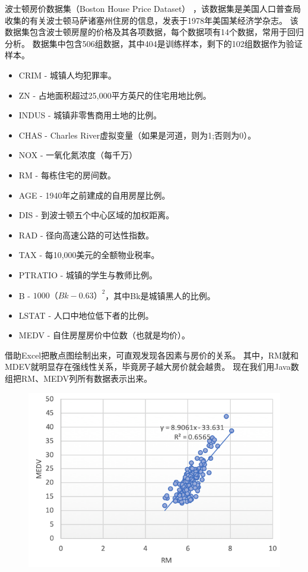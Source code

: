 \begin{example}
	波士顿房价数据集（Boston House Price Dataset）
	，该数据集是美国人口普查局收集的有关波士顿马萨诸塞州住房的信息，发表于1978年美国某经济学杂志。
	该数据集包含波士顿房屋的价格及其各项数据，每个数据项有14个数据，常用于回归分析。
	数据集中包含506组数据，其中404是训练样本，剩下的102组数据作为验证样本。
	\bigskip

	\begin{table}[!htbp]\centering \scriptsize
	\end{table}

	\begin{itemize} \small
		\item CRIM    - 城镇人均犯罪率。
		\item ZN      - 占地面积超过25,000平方英尺的住宅用地比例。
		\item INDUS   - 城镇非零售商用土地的比例。
		\item CHAS    - Charles River虚拟变量（如果是河道，则为1;否则为0）。
		\item NOX     - 一氧化氮浓度（每千万）
		\item RM      - 每栋住宅的房间数。
		\item AGE     - 1940年之前建成的自用房屋比例。
		\item DIS     - 到波士顿五个中心区域的加权距离。
		\item RAD     - 径向高速公路的可达性指数。
		\item TAX       - 每10,000美元的全额物业税率。
		\item PTRATIO - 城镇的学生与教师比例。
		\item B       - $1000（Bk - 0.63）^ 2$，其中Bk是城镇黑人的比例。
		\item LSTAT   - 人口中地位低下者的比例。
		\item MEDV    - 自住房屋房价中位数（也就是均价）。
	\end{itemize}
	\medskip \noindent
	借助Excel把散点图绘制出来，可直观发现各因素与房价的关系。
	其中，RM就和MDEV就明显存在强线性关系，毕竟房子越大房价就会越贵。
	现在我们用Java数组把RM、MEDV列所有数据表示出来。
	\medskip

	\begin{figure}[!htb]
		\centerline{\includegraphics{part1/boston-rm.png}}
	\end{figure}


\end{example}
